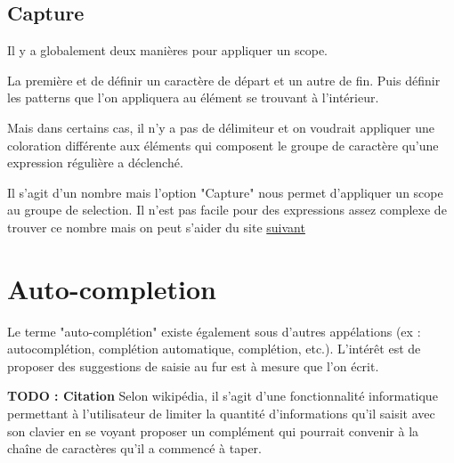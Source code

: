 \documentclass[
    iict, %
    il, %
]{heig-tb}
\begin{document}


\subsection{Capture}

Il y a globalement deux manières pour appliquer un scope.

La première et de définir un caractère de départ et un autre de fin. Puis définir les patterns que l'on appliquera au élément se trouvant à l'intérieur.


Mais dans certains cas, il n'y a pas de délimiteur et on voudrait appliquer une coloration différente aux éléments qui composent le groupe de caractère qu'une expression régulière
a déclenché.


Il s'agit d'un nombre mais l'option "Capture" nous permet d'appliquer un scope au groupe de selection.
Il n'est pas facile pour des expressions assez complexe de trouver ce nombre mais on peut s'aider du site \href{https://regex101.com/}{suivant}



\section{Auto-completion}

Le terme "auto-complétion" existe également sous d'autres appélations (ex : autocomplétion, complétion automatique, complétion, etc.).
L'intérêt est de proposer des suggestions de saisie au fur est à mesure que l'on écrit.

\textbf{TODO : Citation}
Selon wikipédia, il s'agit d'une fonctionnalité informatique permettant à l'utilisateur de limiter la quantité d'informations qu'il saisit avec son clavier
en se voyant proposer un complément qui pourrait convenir à la chaîne de caractères qu'il a commencé à taper.
\end{document}
